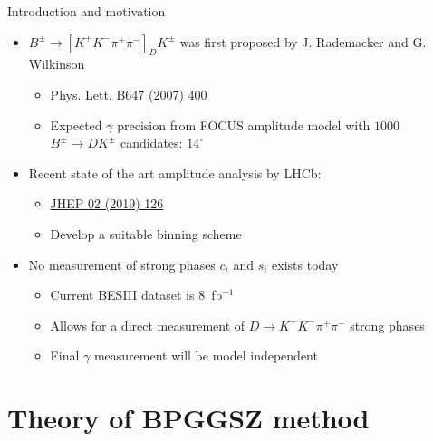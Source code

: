 \documentclass{beamer}
\begin{document}
\begin{frame}{Introduction and motivation}
  \vspace{0.5cm}
  \begin{itemize}
    \setlength\itemsep{1.5em}
    \item{$B^\pm\to[K^+K^-\pi^+\pi^-]_D K^\pm$ was first proposed by J. Rademacker and G. Wilkinson}
    \begin{itemize}
      \item{\href{https://arxiv.org/abs/hep-ph/0611272}{Phys. Lett. B647 (2007) 400}}
      \item{Expected $\gamma$ precision from FOCUS amplitude model with $1000$ $B^\pm\to DK^\pm$ candidates: $14^\circ$}
    \end{itemize}
    \item{Recent state of the art amplitude analysis by LHCb:}
    \begin{itemize}
      \item{\href{https://arxiv.org/abs/1811.08304}{JHEP 02 (2019) 126}}
      \item{Develop a suitable binning scheme}
    \end{itemize}
    \item{No measurement of strong phases $c_i$ and $s_i$ exists today}
    \begin{itemize}
      \item{Current BESIII dataset is $8$~fb$^{-1}$}
      \item{Allows for a direct measurement of $D\to K^+K^-\pi^+\pi^-$ strong phases}
      \item{Final $\gamma$ measurement will be model independent}
    \end{itemize}
  \end{itemize}
\end{frame}

\section{Theory of BPGGSZ method}
\end{document}
